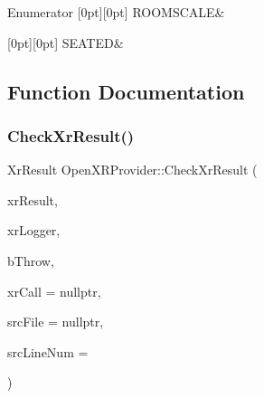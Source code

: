 \begin{DoxyEnumFields}{Enumerator}
[0pt][0pt]{}\mbox{\label{namespace_open_x_r_provider_a005dd91723b05b123b8fccbc41798b05a192dfa44253ba4815ec1a5335f52b578}} 
R\+O\+O\+M\+S\+C\+A\+LE&\\
\hline

[0pt][0pt]{}\mbox{\label{namespace_open_x_r_provider_a005dd91723b05b123b8fccbc41798b05af05478b3d52c3a40a3f66aea7af03dfc}} 
S\+E\+A\+T\+ED&\\
\hline

\end{DoxyEnumFields}


\subsection{Function Documentation}
\mbox{\label{namespace_open_x_r_provider_a832e6cc66984ff274e355f5771a04f57}} 
\subsubsection{\texorpdfstring{CheckXrResult()}{CheckXrResult()}\hspace{0.1cm}{\footnotesize\ttfamily [1/2]}}
{\footnotesize\ttfamily Xr\+Result Open\+X\+R\+Provider\+::\+Check\+Xr\+Result (\begin{DoxyParamCaption}\item[{Xr\+Result}]{xr\+Result,  }\item[{std\+::shared\+\_\+ptr$<$ spdlog\+::logger $>$}]{xr\+Logger,  }\item[{bool}]{b\+Throw,  }\item[{const char $\ast$}]{xr\+Call = {\ttfamily nullptr},  }\item[{const char $\ast$}]{src\+File = {\ttfamily nullptr},  }\item[{int}]{src\+Line\+Num = {} }\end{DoxyParamCaption})\hspace{0.3cm}{\ttfamily [inline]}}

